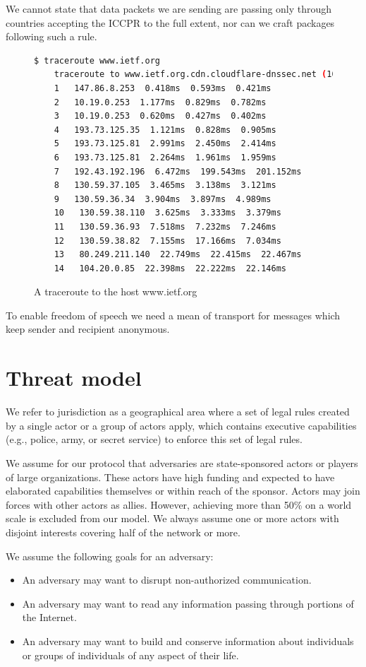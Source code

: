 We cannot state that data packets we are sending are passing only through countries accepting the ICCPR to the full extent, nor can we craft packages following such a rule.

\begin{figure}[H]
	\begin{lstlisting}[language=bash,breaklines=true,basicstyle=\tiny]
	$ traceroute www.ietf.org
	traceroute to www.ietf.org.cdn.cloudflare-dnssec.net (104.20.0.85), 64 hops max
	1   147.86.8.253  0.418ms  0.593ms  0.421ms
	2   10.19.0.253  1.177ms  0.829ms  0.782ms
	3   10.19.0.253  0.620ms  0.427ms  0.402ms
	4   193.73.125.35  1.121ms  0.828ms  0.905ms
	5   193.73.125.81  2.991ms  2.450ms  2.414ms
	6   193.73.125.81  2.264ms  1.961ms  1.959ms
	7   192.43.192.196  6.472ms  199.543ms  201.152ms
	8   130.59.37.105  3.465ms  3.138ms  3.121ms
	9   130.59.36.34  3.904ms  3.897ms  4.989ms
	10   130.59.38.110  3.625ms  3.333ms  3.379ms
	11   130.59.36.93  7.518ms  7.232ms  7.246ms
	12   130.59.38.82  7.155ms  17.166ms  7.034ms
	13   80.249.211.140  22.749ms  22.415ms  22.467ms
	14   104.20.0.85  22.398ms  22.222ms  22.146ms
	\end{lstlisting}
	\caption{A traceroute to the host www.ietf.org}
\end{figure}

To enable freedom of speech we need a mean of transport for messages which keep sender and recipient anonymous.

\section{Threat model\label{sec:adversary}}
We refer to jurisdiction as a geographical area where a set of legal rules created by a single actor or a group of actors apply, which contains executive capabilities (e.g., police, army, or secret service) to enforce this set of legal rules.

We assume for our protocol that adversaries are state-sponsored actors or players of large organizations. These actors have high funding and expected to have elaborated capabilities themselves or within reach of the sponsor. Actors may join forces with other actors as allies. However, achieving more than 50\% on a world scale is excluded from our model. We always assume one or more actors with disjoint interests covering half of the network or more. 

We assume the following goals for an adversary:
\begin{itemize}
	\item An adversary may want to disrupt non-authorized communication.
	\item An adversary may want to read any information passing through portions of the Internet.
	\item An adversary may want to build and conserve information about individuals or groups of individuals of any aspect of their life. 
\end{itemize}

